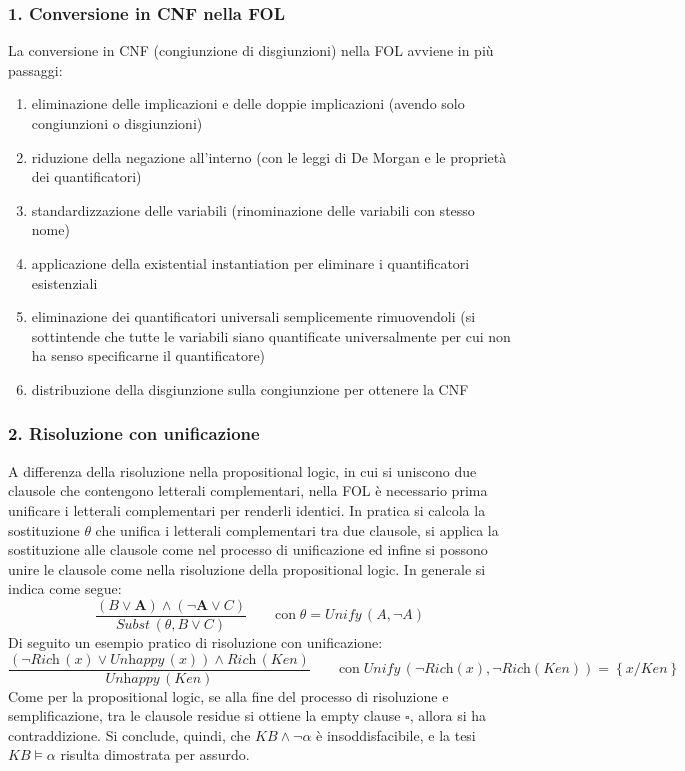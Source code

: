 \subsubsection*{1. Conversione in CNF nella FOL}
La conversione in CNF (congiunzione di disgiunzioni) nella FOL avviene in più passaggi:
\begin{enumerate}
	\item eliminazione delle implicazioni e delle doppie implicazioni (avendo solo congiunzioni o disgiunzioni)
	\item riduzione della negazione all'interno (con le leggi di De Morgan e le proprietà dei quantificatori)
	\item standardizzazione delle variabili (rinominazione delle variabili con stesso nome)
	\item applicazione della existential instantiation per eliminare i quantificatori esistenziali
	\item eliminazione dei quantificatori universali semplicemente rimuovendoli (si sottintende che tutte le
	variabili siano quantificate universalmente per cui non ha senso specificarne il quantificatore)
	\item distribuzione della disgiunzione sulla congiunzione per ottenere la CNF
\end{enumerate}

\subsubsection*{2. Risoluzione con unificazione}
A differenza della risoluzione nella propositional logic, in cui si uniscono due clausole che contengono letterali complementari,
nella FOL è necessario prima unificare i letterali complementari per renderli identici. In pratica si calcola la sostituzione
\(\theta\) che unifica i letterali complementari tra due clausole, si applica la sostituzione alle clausole come nel
processo di unificazione ed infine si possono unire le clausole come nella risoluzione della propositional logic. In generale
si indica come segue:
\[\frac{(B \lor \textbf{A}) \land (\neg \textbf{A} \lor C)}{\textit{Subst} \, (\theta, B \lor C)} \qquad \text{con} \; \theta = \textit{Unify} \, (A, \neg A)\]
Di seguito un esempio pratico di risoluzione con unificazione:
\[\frac{(\neg \textit{Rich} \, (x) \lor \textit{Unhappy}\,(x)) \land \textit{Rich} \, (\textit{Ken})}{\textit{Unhappy} \, (\textit{Ken})} \qquad \text{con} \; \textit{Unify} \, (\neg \textit{Rich}(x), \neg \textit{Rich}(\textit{Ken})) = \left\{ x / \textit{Ken} \right\}\]
Come per la propositional logic, se alla fine del processo di risoluzione e semplificazione, tra le clausole residue si
ottiene la empty clause \(\square\), allora si ha contraddizione. Si conclude, quindi, che \(KB \land \neg \alpha\) è
insoddisfacibile, e la tesi \(KB \models \alpha\) risulta dimostrata per assurdo.

